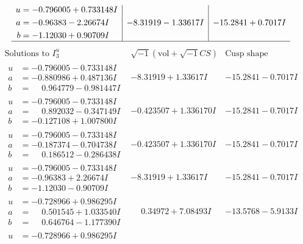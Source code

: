 \documentclass[1p]{elsarticle_modified}
\theoremstyle{definition}
\newcommand{\I}{\sqrt{-1}}
\begin{document}
$$\begin{array}{c|c|c}
\begin{aligned}
u &= -0.796005 + 0.733148 I \\
a &= -0.96383 - 2.26674 I \\
b &= -1.12030 + 0.90709 I\end{aligned}
 & -8.31919 - 1.33617 I & -15.2841 + 0.7017 I\\
 \hline 
 \end{array}$$\newpage$$\begin{array}{c|c|c}  
\text{Solutions to }I^u_{3}& \I (\text{vol} + \sqrt{-1}CS) & \text{Cusp shape}\\
 \hline 
\begin{aligned}
u &= -0.796005 - 0.733148 I \\
a &= -0.880986 + 0.487136 I \\
b &= \phantom{-}0.964779 - 0.981447 I\end{aligned}
 & -8.31919 + 1.33617 I & -15.2841 - 0.7017 I \\ \hline\begin{aligned}
u &= -0.796005 - 0.733148 I \\
a &= \phantom{-}0.892032 - 0.347149 I \\
b &= -0.127108 + 1.007800 I\end{aligned}
 & -0.423507 + 1.336170 I & -15.2841 - 0.7017 I \\ \hline\begin{aligned}
u &= -0.796005 - 0.733148 I \\
a &= -0.187374 - 0.704738 I \\
b &= \phantom{-}0.186512 - 0.286438 I\end{aligned}
 & -0.423507 + 1.336170 I & -15.2841 - 0.7017 I \\ \hline\begin{aligned}
u &= -0.796005 - 0.733148 I \\
a &= -0.96383 + 2.26674 I \\
b &= -1.12030 - 0.90709 I\end{aligned}
 & -8.31919 + 1.33617 I & -15.2841 - 0.7017 I \\ \hline\begin{aligned}
u &= -0.728966 + 0.986295 I \\
a &= \phantom{-}0.501545 + 1.033540 I \\
b &= \phantom{-}0.646764 - 1.177390 I\end{aligned}
 & \phantom{-}0.34972 + 7.08493 I & -13.5768 - 5.9133 I \\ \hline\begin{aligned}
u &= -0.728966 + 0.986295 I \\

\end{aligned}
\end{array}$$
\end{document}
